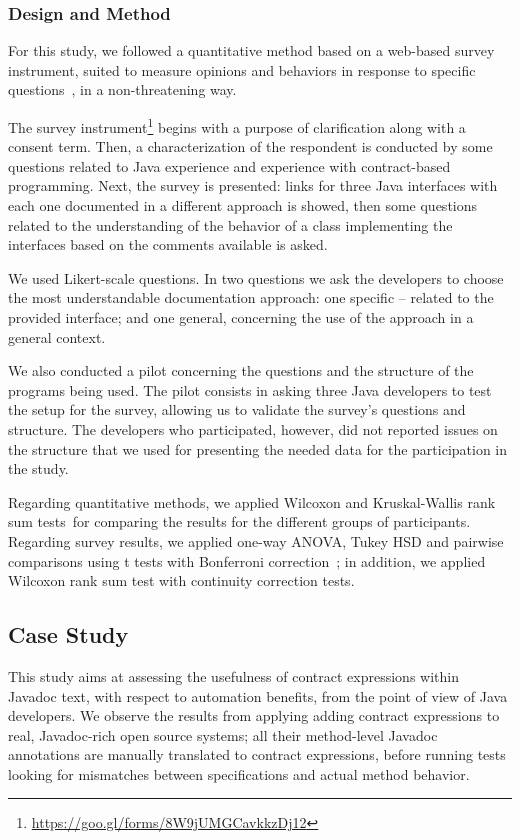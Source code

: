 \subsubsection{Design and Method}
\label{sec:surveyDes}

For this study, we followed a quantitative method based on a web-based survey instrument, suited to measure opinions and behaviors in response to specific questions~\cite{refSurvey}, in a non-threatening way. 

The survey
instrument\footnote{\url{https://goo.gl/forms/8W9jUMGCavkkzDj12}} begins with a purpose of clarification along with a consent term.
Then, a characterization of the respondent is conducted by some questions related to Java experience and experience with contract-based programming. Next, the survey is presented: links for three Java interfaces with each one documented in a different approach is showed, then some questions related to the understanding of the behavior of a class implementing the interfaces based on the comments available is asked. 

We used Likert-scale questions. In two questions we ask the developers to choose the most understandable documentation approach: one specific -- related to the provided interface; and one general, concerning the use of the approach in a general
context.

We also conducted a pilot concerning the questions and the structure of the programs being used. The pilot consists in asking three Java
developers to test the setup for the survey, allowing us to validate the survey's questions and structure. The developers who participated, however, did not reported issues on the structure that we used for presenting the needed data for the participation in the study.

Regarding quantitative methods, we applied Wilcoxon and Kruskal-Wallis rank sum tests~\cite{statistical}for comparing the results for the different groups of participants. Regarding survey results, we applied one-way ANOVA, Tukey HSD and pairwise comparisons using t tests with Bonferroni correction~\cite{statistical}; in addition, we applied Wilcoxon rank sum test with continuity correction tests.

\subsection{Case Study}
\label{sec:caseStudy}
This study aims at assessing the usefulness of contract expressions within Javadoc text, with respect to automation benefits, from the point of view of Java developers. 
We observe the results from applying adding contract expressions to \totalSystems{} real, Javadoc-rich open source systems; all their method-level Javadoc annotations are manually translated to contract expressions, before running tests looking for mismatches between specifications and actual method behavior.

